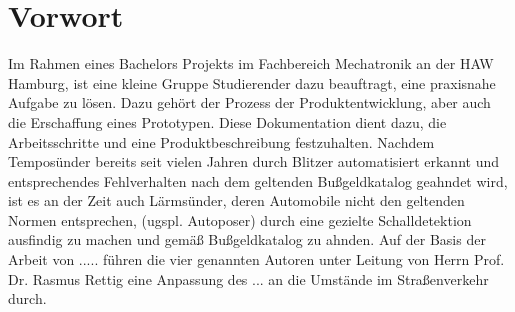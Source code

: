 \section{Vorwort}

Im Rahmen eines Bachelors Projekts im Fachbereich Mechatronik an der HAW Hamburg, ist eine kleine Gruppe Studierender dazu beauftragt, eine praxisnahe Aufgabe zu lösen. Dazu gehört der Prozess der Produktentwicklung, aber auch die Erschaffung eines Prototypen. Diese Dokumentation dient dazu, die Arbeitsschritte und eine Produktbeschreibung festzuhalten.
Nachdem Temposünder bereits seit vielen Jahren durch Blitzer automatisiert erkannt und entsprechendes Fehlverhalten nach dem geltenden Bußgeldkatalog geahndet wird, ist es an der Zeit auch Lärmsünder, deren Automobile nicht den geltenden Normen entsprechen, (ugspl. Autoposer) durch eine gezielte Schalldetektion ausfindig zu machen und gemäß Bußgeldkatalog zu ahnden. Auf der Basis der Arbeit von ..... führen die vier genannten Autoren unter Leitung von Herrn Prof. Dr. Rasmus Rettig eine Anpassung des ... an die Umstände im Straßenverkehr durch.
\newpage